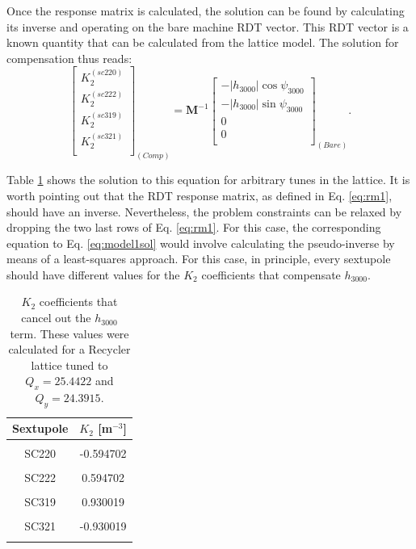 Once the response matrix is calculated, the solution can be found by calculating its inverse and operating on the bare machine RDT vector. This RDT vector is a known quantity that can be calculated from the lattice model. The solution for compensation thus reads:
\begin{equation}
    \label{eq:model1sol}
    \begin{bmatrix}
        K_2^{(sc220)} \\
        K_2^{(sc222)}\\
        K_2^{(sc319)} \\
        K_2^{(sc321)}\\
    \end{bmatrix}_{(Comp)}
    =
    \boldsymbol{M}^{-1} 
    \begin{bmatrix}
        -|h_{3000}| \cos \psi_{3000} \\
        -|h_{3000}| \sin \psi_{3000} \\
        0 \\
        0 \\
    \end{bmatrix}_{(Bare)}.
\end{equation}

Table \ref{tab:k2sh3000} shows the solution to this equation for arbitrary tunes in the lattice. It is worth pointing out that the RDT response matrix, as defined in Eq. \ref{eq:rm1}, should have an inverse. Nevertheless, the problem constraints can be relaxed by dropping the two last rows of Eq. \ref{eq:rm1}. For this case, the corresponding equation to Eq. \ref{eq:model1sol} would involve calculating the pseudo-inverse by means of a least-squares approach. For this case, in principle, every sextupole should have different values for the $K_2$ coefficients that compensate $h_{3000}$. 

\begin{table}[H]
    \centering
    \caption{$K_2$ coefficients that cancel out the $h_{3000}$ term. These values were calculated for a Recycler lattice tuned to $Q_x=25.4422$ and $Q_y=24.3915$.}
    \label{tab:k2sh3000}
    \begin{tabular}{cc}
    \toprule
    \textbf{Sextupole} & $K_2$ [m$^{-3}$] \\ \midrule
     &  \\
    SC220 & -0.594702 \\
     &  \\
    SC222 & 0.594702 \\
     &  \\
    SC319 & 0.930019 \\
     &  \\
    SC321 & -0.930019 \\
     &  \\ \hline
    \end{tabular}
    \end{table}

